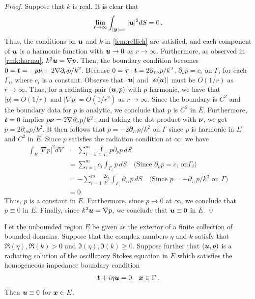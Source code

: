 \begin{proof}
Suppose that $k$ is real. It is clear that
\begin{equation}
\lim_{r\to\infty} \int_{|{\boldsymbol y}|=r} |{\boldsymbol u}|^2 dS = 0 \, . \nonumber
\end{equation}
Thus, the conditions on ${\boldsymbol u}$ and $k$ in \cref{lem:rellich}
are satisfied, and each component of ${\boldsymbol u}$ is a harmonic function
with ${\boldsymbol u} \to 0$ as $r \to \infty$. Furthermore, as observed
in \cref{rmk:harmu}, $k^2 {\boldsymbol u} = \nabla p$. Then, the boundary
condition becomes $0 = {\boldsymbol t} = -p {\boldsymbol \nu} + 2 \nabla \partial_\nu p/k^2$.
Because $0 = {\boldsymbol \tau} \cdot {\boldsymbol t} = 2\partial_{\tau\nu} p/k^2$,
$\partial_\nu p  = c_{i}$ on $\Gamma_{i}$ for each $\Gamma_{i}$,
where $c_{i}$ is a constant. 
Observe that $|{\boldsymbol u}|$ and $|{\boldsymbol e}({\boldsymbol u})|$ must be $O(1/r)$ as
$r\to\infty$. Thus,
for a radiating pair $({\boldsymbol u},p)$ with $p$ harmonic,
we have that $|p| = O(1/r)$ and $|\nabla p| = O(1/r^2)$
as $r\to\infty$.
Since the boundary is $C^{2}$ and the boundary data for $p$
is analytic, we conclude that $p$ is $C^{2}$ in
$\overline{E}$.
Furthermore, ${\boldsymbol t}=0$ implies $p {\boldsymbol \nu} = 2\nabla \partial_{\nu} p/k^2$, 
and taking the dot
product with ${\boldsymbol \nu}$, we get
$p = 2\partial_{\nu \nu}p/k^2$. 
It then follows that
$p = -2\partial_{\tau \tau}p/k^2$ on $\Gamma$ since 
$p$ is harmonic in $E$ and $C^{2}$ in $\overline{E}$. 
Since $p$ satisfies the radiation condition at $\infty$,
we have
\begin{equation}
\begin{aligned}
\int_{E} |\nabla p|^2 dV &= 
\sum_{i=1}^{m} \int_{\Gamma_{i}} p \partial_{\nu}p \,dS \\
&= \sum_{i=1}^{m} c_{i} \int_{\Gamma_{i}} p \,dS \quad \text{(Since $\partial_{\nu} p = c_{i}$ on
$\Gamma_{i}$)} \\ 
&= -\sum_{i=1}^{m} \frac{2c_{i}}{k^2} \int_{\Gamma_{i}} \partial_{\tau \tau} p \,dS 
\quad \text{(Since $p = -\partial_{\tau \tau}p/k^2$ on $\Gamma$)} \\
&= 0
\end{aligned}
\end{equation}
Thus, $p$ is a constant in $E$. Furthermore, since $p\to 0$ at $\infty$, 
we conclude that $p\equiv 0$ in $E$. 
Finally, since $k^2 {\boldsymbol u} = \nabla p$, we conclude that ${\boldsymbol u}\equiv 0$ in 
$E$.
\qed
\end{proof}

\begin{theorem}
  Let the unbounded region $E$ be given as the exterior
  of a finite collection of bounded domains.
  Suppose that the complex numbers $\eta$ and $k$ satisfy that
  $\Re(\eta), \Re(k) > 0$ and $\Im(\eta),\Im(k) \geq 0$.
  Suppose further that
  $({\boldsymbol u},p)$ is a radiating solution of the
  oscillatory Stokes equation in $E$ which satisfies
  the homogeneous impedance boundary condition
  \begin{equation}
{\boldsymbol t} + i \eta {\boldsymbol u} = 0 \quad {\boldsymbol x} \in \Gamma \, . \nonumber
\end{equation}
Then ${\boldsymbol u} \equiv 0$ for ${\boldsymbol x} \in E$.
\end{theorem}

